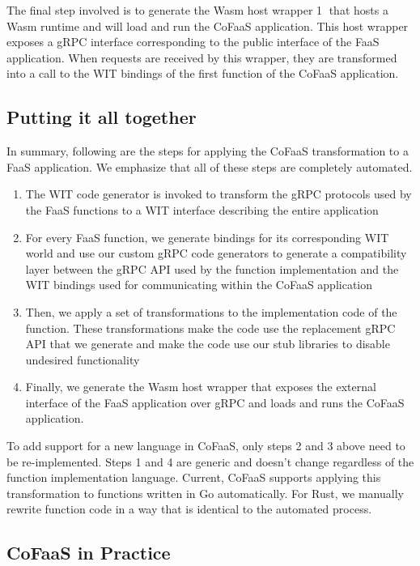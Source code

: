 The final step involved is to generate the Wasm host wrapper \textcircled{1} that hosts a Wasm runtime and will load and run the CoFaaS application. This host wrapper exposes a gRPC interface corresponding to the public interface of the FaaS application. When requests are received by this wrapper, they are transformed into a call to the WIT bindings of the first function of the CoFaaS application.

\subsection{Putting it all together}
\label{subsec:cofaas-overview}

In summary, following are the steps for applying the CoFaaS transformation to a FaaS application. We emphasize that all of these steps are completely automated.

\begin{enumerate}
\item The WIT code generator is invoked to transform the gRPC protocols used by the FaaS functions to a WIT interface describing the entire application 
\item For every FaaS function, we generate bindings for its corresponding WIT world and use our custom gRPC code generators to generate a compatibility layer between the gRPC API used by the function implementation and the WIT bindings used for communicating within the CoFaaS application
\item Then, we apply a set of transformations to the implementation code of the function. These transformations make the code use the replacement gRPC API that we generate and make the code use our stub libraries to disable undesired functionality
  \item  Finally, we generate the Wasm host wrapper that exposes the external interface of the FaaS application over gRPC and loads and runs the CoFaaS application.
\end{enumerate}

To add support for a new language in CoFaaS, only steps 2 and 3 above need to be re-implemented. Steps 1 and 4 are generic and doesn't change regardless of the function implementation language. Current, CoFaaS supports applying this transformation to functions written in Go automatically. For Rust, we manually rewrite function code in a way that is identical to the automated process.

\subsection{CoFaaS in Practice}
\label{subsec:practice}

